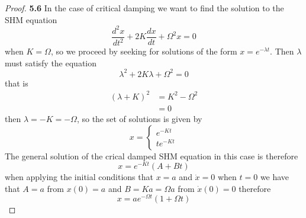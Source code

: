 \documentclass[11pt]{article}
\theoremstyle{definition}
\begin{document}
	\begin{proof}{\textbf{5.6}}
        In the case of critical damping we want to find the solution to the
        SHM equation
        $$\frac{d^2x}{dt^2} + 2K\frac{dx}{dt} + \Omega^2x = 0$$
        when $K = \Omega$, so we proceed by seeking for solutions of the form
        $x = e^{-\lambda t}$. Then $\lambda$ must satisfy the equation
        $$\lambda^2 + 2K\lambda + \Omega^2 = 0$$
        that is
        \begin{align*}
            (\lambda + K)^2 &= K^2 - \Omega^2 \\
                            &= 0
        \end{align*}
        then $\lambda = -K = -\Omega$, so the set of solutions is given by
        \begin{equation*}
            x = 
            \begin{cases}
                e^{-K t} \\
                te^{-K t}
            \end{cases}
        \end{equation*}
        The general solution of the crical damped SHM equation in this case is
        therefore
        $$x = e^{-Kt}(A + Bt)$$
        when applying the initial conditions that $x=a$ and $\dot{x} =0 $ when
        $t=0$ we have that $A = a$ from $x(0) = a$ and $B = Ka = \Omega a$ from
        $\dot{x}(0) = 0$ therefore
        $$x = ae^{-\Omega t}(1 + \Omega t)$$
    \end{proof}
\cleardoublepage
\end{document}
